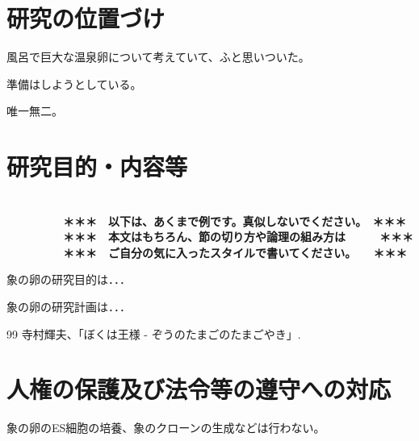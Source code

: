 \documentclass[11pt,a4j,dvipdfmx]{jarticle} 					%
\newcommand{\研究課題名}{象の卵}
\newcommand{\研究機関名}{逢坂大学}
\newcommand{\研究代表者氏名}{湯川秀樹}
\begin{document}

\section{研究の位置づけ}

		風呂で巨大な温泉卵について考えていて、ふと思いついた。

	準備はしようとしている。

	唯一無二。




\section{研究目的・内容等}

\textbf{\\　　　　　＊＊＊　以下は、あくまで例です。真似しないでください。　＊＊＊\\
　　　　　＊＊＊　本文はもちろん、節の切り方や論理の組み方は　　　＊＊＊\\
　　　　　＊＊＊　ご自分の気に入ったスタイルで書いてください。　　＊＊＊}

	 象の卵の研究目的は．．．

	象の卵の研究計画は．．．

	\vspace{1cm}
	\begin{thebibliography}{99}
		 寺村輝夫、「ぼくは王様 - ぞうのたまごのたまごやき」.
	\end{thebibliography}



\section{人権の保護及び法令等の遵守への対応}

	象の卵のES細胞の培養、象のクローンの生成などは行わない。
\end{document}
